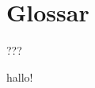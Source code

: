 \documentclass[a4paper, ngerman]{report}
\newcommand{\sepauthor}[1]{\vspace{-5.6em}\begin{flushright}#1\end{flushright}}
\begin{document}
\tableofcontents


\chapter{Glossar} \sepauthor{???}

hallo!
\end{document}
